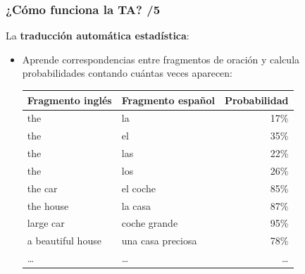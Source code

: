 \documentclass{beamer}
\begin{document}
\begin{frame}
\frametitle{¿Cómo funciona la TA? /5}

La \textbf{traducción automática estadística}:
\begin{itemize}
\item Aprende correspondencias entre fragmentos de oración y calcula probabilidades contando cuántas veces aparecen:
\begin{center}
  \begin{tabular}{l|l|r}
  \textbf{Fragmento inglés} & \textbf{Fragmento español} & Probabilidad \\
  \hline
  the  & la  & 17\% \\
  the  & el & 35\% \\
  the  & las & 22\% \\
  the  & los & 26\% \\
  the car & el coche & 85\% \\
  the house & la casa & 87\% \\
  large car & coche grande & 95\% \\
  a beautiful house & una casa preciosa & 78\% \\
  \ldots & \ldots & \ldots \\
  \end{tabular}
\end{center}

\end{itemize}
\end{frame}
\end{document}
